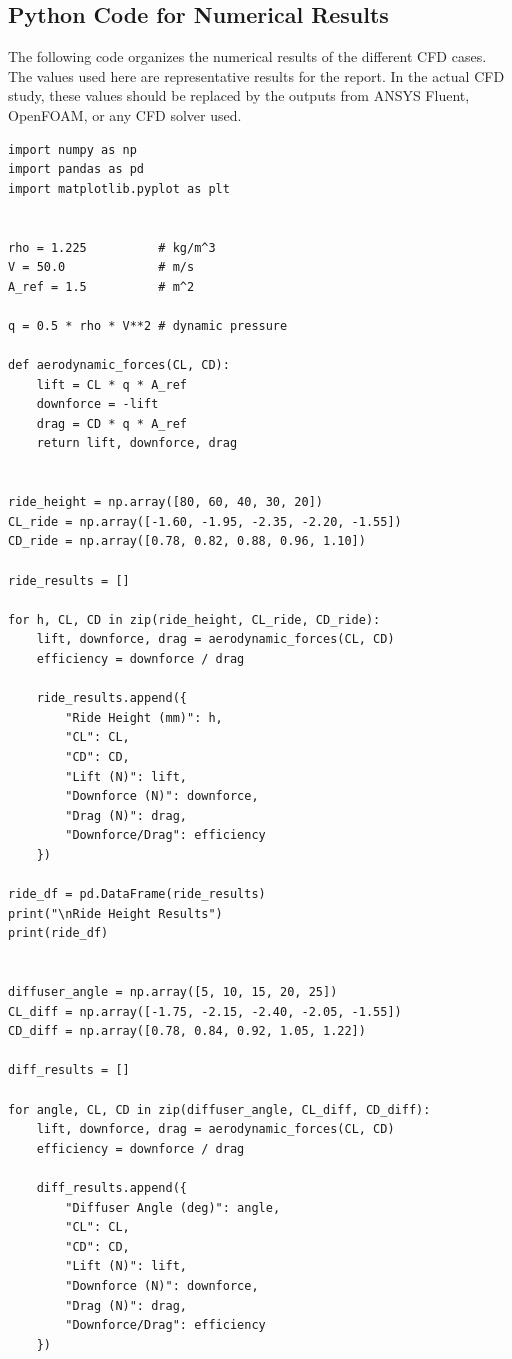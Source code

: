 \documentclass[12pt,a4paper]{article}
\begin{document}
\subsection{Python Code for Numerical Results}

The following code organizes the numerical results of the different CFD cases. The values used here are representative results for the report. In the actual CFD study, these values should be replaced by the outputs from ANSYS Fluent, OpenFOAM, or any CFD solver used.

\begin{lstlisting}[style=cleanPython, caption={Clean Python code for calculating aerodynamic forces and numerical comparison}]
import numpy as np
import pandas as pd
import matplotlib.pyplot as plt


rho = 1.225          # kg/m^3
V = 50.0             # m/s
A_ref = 1.5          # m^2

q = 0.5 * rho * V**2 # dynamic pressure

def aerodynamic_forces(CL, CD):
    lift = CL * q * A_ref
    downforce = -lift
    drag = CD * q * A_ref
    return lift, downforce, drag


ride_height = np.array([80, 60, 40, 30, 20])
CL_ride = np.array([-1.60, -1.95, -2.35, -2.20, -1.55])
CD_ride = np.array([0.78, 0.82, 0.88, 0.96, 1.10])

ride_results = []

for h, CL, CD in zip(ride_height, CL_ride, CD_ride):
    lift, downforce, drag = aerodynamic_forces(CL, CD)
    efficiency = downforce / drag

    ride_results.append({
        "Ride Height (mm)": h,
        "CL": CL,
        "CD": CD,
        "Lift (N)": lift,
        "Downforce (N)": downforce,
        "Drag (N)": drag,
        "Downforce/Drag": efficiency
    })

ride_df = pd.DataFrame(ride_results)
print("\nRide Height Results")
print(ride_df)


diffuser_angle = np.array([5, 10, 15, 20, 25])
CL_diff = np.array([-1.75, -2.15, -2.40, -2.05, -1.55])
CD_diff = np.array([0.78, 0.84, 0.92, 1.05, 1.22])

diff_results = []

for angle, CL, CD in zip(diffuser_angle, CL_diff, CD_diff):
    lift, downforce, drag = aerodynamic_forces(CL, CD)
    efficiency = downforce / drag

    diff_results.append({
        "Diffuser Angle (deg)": angle,
        "CL": CL,
        "CD": CD,
        "Lift (N)": lift,
        "Downforce (N)": downforce,
        "Drag (N)": drag,
        "Downforce/Drag": efficiency
    })


\end{lstlisting}
\end{document}
